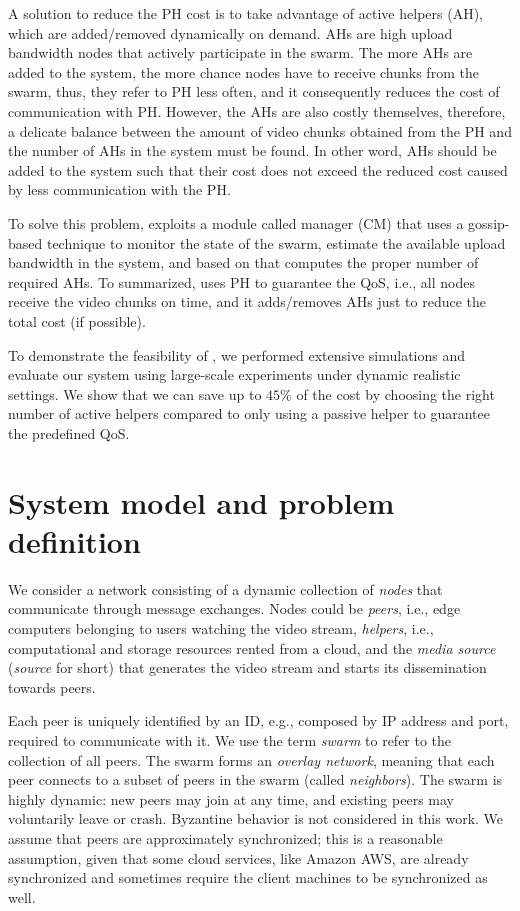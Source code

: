 A solution to reduce the PH cost is to take advantage of active helpers (AH), which are added/removed dynamically on demand. AHs are high upload bandwidth nodes that actively participate in the swarm. The more AHs are added to the system, the more chance nodes have to receive chunks from the swarm, thus, they refer to PH less often, and it consequently reduces the cost of communication with PH. However, the AHs are also costly themselves, therefore, a delicate balance between the amount of video chunks obtained from the PH and the number of AHs in the system must be found. In other word, AHs should be added to the system such that their cost does not exceed the reduced cost caused by less communication with the PH.

To solve this problem, \clive exploits a module called \clive manager (CM) that uses a gossip-based technique to monitor the state of the swarm, estimate the available upload bandwidth in the system, and based on that computes the proper number of required AHs. To summarized, \clive uses PH to guarantee the QoS, i.e., all nodes receive the video chunks on time, and it adds/removes AHs just to reduce the total cost (if possible).

To demonstrate the feasibility of \clive, we performed extensive simulations
and evaluate our system using large-scale experiments under dynamic realistic
settings. We show that we can save up to $45\%$ of the cost by choosing the
right number of active helpers compared to only using a passive helper to
guarantee the predefined QoS.

\section{System model and problem definition} \label{sec:problem}

We consider a network consisting of a dynamic collection of \emph{nodes} that
communicate through message exchanges. Nodes could be \emph{peers}, i.e., edge
computers belonging to users watching the video stream, \emph{helpers}, i.e.,
computational and storage resources rented from a cloud, and the
\emph{media source} (\emph{source} for short) that generates the video
stream and starts its dissemination towards peers.

Each peer is uniquely identified by an ID, e.g., composed by IP address and
port, required to communicate with it. We use the term \emph{swarm} to refer
to the collection of all peers. The swarm forms an \emph{overlay network},
meaning that each peer connects to a subset of peers in the swarm (called
\emph{neighbors}). The swarm is highly dynamic: new peers may join at any
time, and existing peers may voluntarily leave or crash. Byzantine behavior is
not considered in this work. We assume that peers are approximately synchronized; this is a reasonable
assumption, given that some cloud services, like Amazon AWS, are already
synchronized and sometimes require the client machines to be synchronized as
well.

